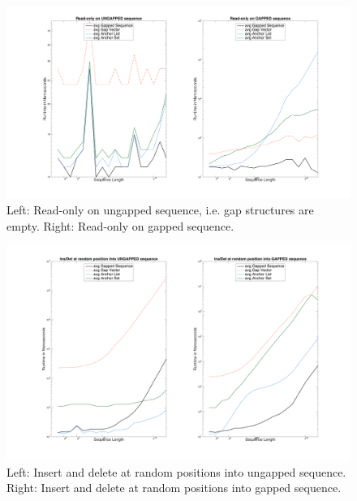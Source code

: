 \documentclass[11pt, letterpaper, twoside]{article}
\begin{document}
\begin{figure}[htpb]\centering
\includegraphics[scale=.4,trim={5cm 2cm 4.5cm 1.5cm},clip]{benchmark1_plot.png}
\caption{Left: Read-only on ungapped sequence, i.e. gap structures are empty. Right: 
Read-only on gapped sequence.}
\end{figure}

\begin{figure}[htpb]\centering
\includegraphics[scale=.4,trim={5cm 2cm 4.5cm 1.5cm},clip]{benchmark2_plot.png}
\caption{Left: Insert and delete at random positions into ungapped sequence. Right: 
Insert and delete at random positions into gapped sequence.}
\end{figure}
\end{document}
